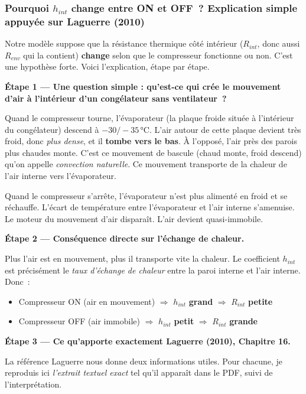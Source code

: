 \documentclass[11pt,a4paper]{article}
\begin{document}
\subsubsection*{Pourquoi $h_{int}$ change entre ON et OFF~? Explication simple appuyée sur Laguerre (2010)}

Notre modèle suppose que la résistance thermique côté intérieur ($R_{int}$, donc aussi
$R_{env}$ qui la contient) \textbf{change} selon que le compresseur fonctionne ou non.
C'est une hypothèse forte. Voici l'explication, étape par étape.

\medskip
\textbf{Étape 1 — Une question simple : qu'est-ce qui crée le mouvement d'air à
l'intérieur d'un congélateur sans ventilateur~?}

Quand le compresseur tourne, l'évaporateur (la plaque froide située à l'intérieur du
congélateur) descend à $-30/-35\,\si{\celsius}$. L'air autour de cette plaque devient très
froid, donc \emph{plus dense}, et il \textbf{tombe vers le bas}. À l'opposé, l'air près
des parois plus chaudes monte. C'est ce mouvement de bascule (chaud monte, froid descend)
qu'on appelle \emph{convection naturelle}. Ce mouvement transporte de la chaleur de
l'air interne vers l'évaporateur.

Quand le compresseur s'arrête, l'évaporateur n'est plus alimenté en froid et se réchauffe.
L'écart de température entre l'évaporateur et l'air interne s'amenuise. Le moteur du
mouvement d'air disparaît. L'air devient quasi-immobile.

\medskip
\textbf{Étape 2 — Conséquence directe sur l'échange de chaleur.}

Plus l'air est en mouvement, plus il transporte vite la chaleur. Le coefficient $h_{int}$
est précisément le \emph{taux d'échange de chaleur} entre la paroi interne et l'air
interne. Donc~:
\begin{itemize}[itemsep=0pt]
\item Compresseur ON (air en mouvement) $\Rightarrow$ $h_{int}$ \textbf{grand} $\Rightarrow$ $R_{int}$ \textbf{petite}
\item Compresseur OFF (air immobile) $\Rightarrow$ $h_{int}$ \textbf{petit} $\Rightarrow$ $R_{int}$ \textbf{grande}
\end{itemize}

\medskip
\textbf{Étape 3 — Ce qu'apporte exactement Laguerre (2010), Chapitre 16.}

La référence Laguerre nous donne deux informations utiles. Pour chacune, je reproduis ici
\emph{l'extrait textuel exact} tel qu'il apparaît dans le PDF, suivi de l'interprétation.
\end{document}

